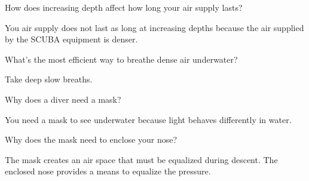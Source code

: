 	\begin{qanda}
		\begin{question}
How does increasing depth affect how long your air supply lasts?
		\end{question}

		\begin{answer}
You air supply does not last as long at increasing depths because the air supplied by the SCUBA equipment is denser.
		\end{answer}
	\end{qanda}

	\begin{qanda}
		\begin{question}
What's the most efficient way to breathe dense air underwater?
		\end{question}

		\begin{answer}
Take deep slow breaths.
		\end{answer}
	\end{qanda}

	\begin{qanda}
		\begin{question}
Why does a diver need a mask?
		\end{question}

		\begin{answer}
You need a mask to see underwater because light behaves differently in water.
		\end{answer}
	\end{qanda}

	\begin{qanda}
		\begin{question}
Why does the mask need to enclose your nose?
		\end{question}

		\begin{answer}
The mask creates an air space that must be equalized during descent.  The enclosed nose provides a means to equalize the pressure.
		\end{answer}
	\end{qanda}

